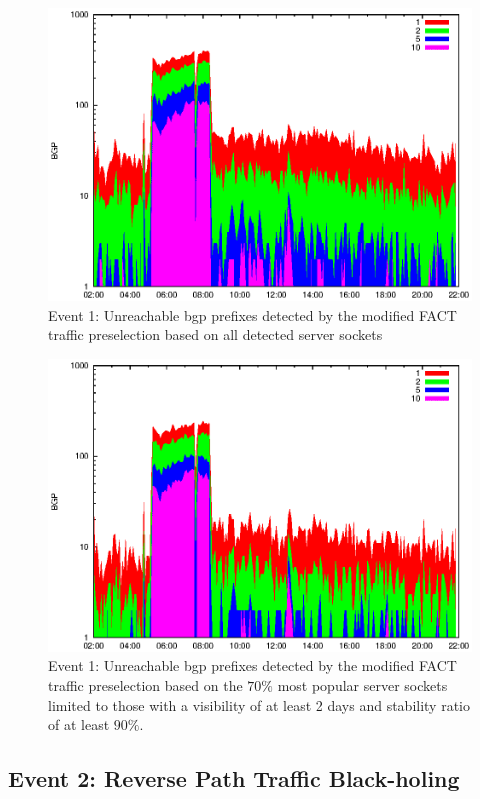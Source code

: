 \begin{figure}
	[p] \centering 
	\includegraphics[width=0.75\linewidth]{images/events/2010_03_25/bgp_log_all_external.eps} \caption{Event 1: Unreachable \gls{bgp} prefixes detected by the modified \gls{FACT} traffic preselection based on all detected \glspl{server socket}} 
	\label{fig:AMS_IX_FACT_allSES} 
\end{figure}
\begin{figure}
	[p] \centering 
	\includegraphics[width=0.75\linewidth]{images/events/2010_03_25/bgp_log_Set_var_0_1_stab_9_vts_2.eps} \caption{Event 1: Unreachable \gls{bgp} prefixes detected by the modified \gls{FACT} traffic preselection based on the $70\%$ most popular \glspl{server socket} limited to those with a visibility of at least 2 days and stability ratio of at least $90\%$.} 
	\label{fig:AMS_IX_FACT_popularVTS2STAB9} 
\end{figure}

\newpage 
\subsection{Event 2: Reverse Path Traffic Black-holing}

